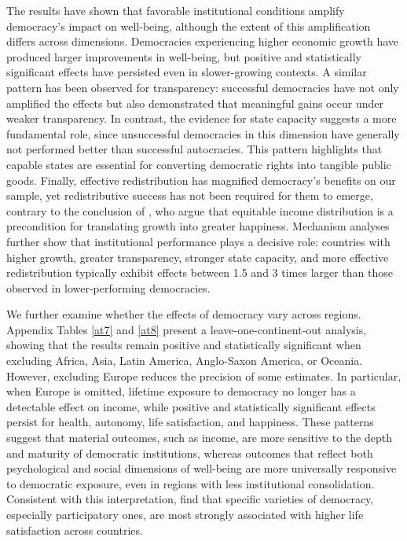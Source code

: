 \documentclass[11pt]{article}
\newcommand{\bbb}[1]{\cTwo{#1}} %
\begin{document}
The results have shown that favorable institutional conditions amplify democracy’s impact on well-being, although the extent of this amplification differs across dimensions. Democracies experiencing higher economic growth have produced larger improvements in well-being, but positive and statistically significant effects have persisted even in slower-growing contexts. A similar pattern has been observed for transparency: successful democracies have not only amplified the effects but also demonstrated that meaningful gains occur under weaker transparency. In contrast, the evidence for state capacity suggests a more fundamental role, since unsuccessful democracies in this dimension have generally not performed better than successful autocracies. This pattern highlights that capable states are essential for converting democratic rights into tangible public goods. Finally, effective redistribution has magnified democracy’s benefits on our sample, yet redistributive success has not been required for them to emerge, contrary to the conclusion of \bbb{Oishi2015}, who argue that equitable income distribution is a precondition for translating growth into greater happiness. Mechanism analyses further show that institutional performance plays a decisive role: countries with higher growth, greater transparency, stronger state capacity, and more effective redistribution typically exhibit effects between 1.5 and 3 times larger than those observed in lower-performing democracies.

We further examine whether the effects of democracy vary across regions. Appendix Tables \ref{at7} and \ref{at8} present a leave-one-continent-out analysis, showing that the results remain positive and statistically significant when excluding Africa, Asia, Latin America, Anglo-Saxon America, or Oceania. However, excluding Europe reduces the precision of some estimates. In particular, when Europe is omitted, lifetime exposure to democracy no longer has a detectable effect on income, while positive and statistically significant effects persist for health, autonomy, life satisfaction, and happiness. These patterns suggest that material outcomes, such as income, are more sensitive to the depth and maturity of democratic institutions, whereas outcomes that reflect both psychological and social dimensions of well-being are more universally responsive to democratic exposure, even in regions with less institutional consolidation. Consistent with this interpretation, \bbb{Bromo2024} find that specific varieties of democracy, especially participatory ones, are most strongly associated with higher life satisfaction across countries.
\end{document}
